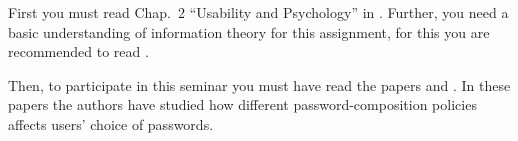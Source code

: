 First you must read Chap.~2 \enquote{Usability and Psychology} in 
\cite{Anderson2008sea}.
Further, you need a basic understanding of information theory 
\cite{Shannon1948amt} for this assignment, for this you are recommended to read 
 \cite{Ueltschi2013se}.

Then, to participate in this seminar you must have read the papers 
 \cite{Komanduri2011opa} and 
 \cite{Komanduri2014can}.
In these papers the authors have studied how different password-composition 
policies affects users' choice of passwords.
